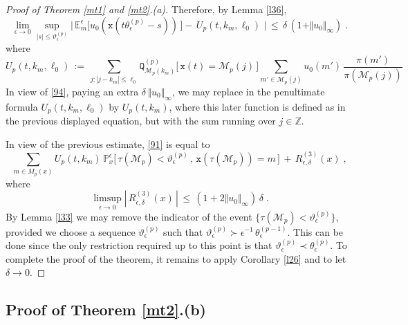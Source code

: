 \documentclass[reqno]{amsart}
\theoremstyle{plain}
\theoremstyle{definition}
\newcommand{\bb}[1]{{\mathbb #1}}
\newcommand{\ms}[1]{{\mathscr #1}}
\newcommand{\mtt}[1]{{\mathtt #1}}
\newcounter{as}[section]
\newcommand{\<}{\langle}
\renewcommand{\>}{\rangle}
\begin{document}
\begin{proof}[Proof of Theorem \ref{mt1} and \ref{mt2}.{\rm (a)}]
Therefore, by Lemma \ref{l36},
\begin{equation*}
\lim_{\epsilon\to 0} \sup_{|s|\le \vartheta^{(p)}_\epsilon}
\Big|\, \bb E^{\epsilon}_{m} \big[ u_0( \mtt x(t\theta^{(p)}_\epsilon - s))
\,\big]  -\, U_p(t,k_m, \ell_0)  \,\,\Big|
\,\le\,  \delta\, (1+\Vert u_0\Vert_\infty)\;.
\end{equation*}
where
\begin{equation}
\label{95}
U_p(t,k_m, \ell_0) \,:=\, \sum_{j: |j-k_m|\le \ell_0}
\mtt {Q}_{\ms M_p(k_m)}^{(p)}\big[\, \mtt x(t)= \ms M_p(j)\,\big]
\sum_{m'\in \ms M_p(j)} u_0(m')\, 
\frac{\pi (m')}{\pi(\ms M_p(j))}
\end{equation}
In view of \eqref{94}, paying an extra
$\delta\, \Vert u_0\Vert_\infty$, we may replace in the penultimate
formula $U_p(t,k_m, \ell_0)$ by $U_p(t,k_m)$, where this later
function is defined as in the previous displayed equation, but with
the sum running over $j\in \bb Z$.

\smallskip{} In view of the previous
estimate, \eqref{91} is equal to
\begin{equation*}
\sum_{m\in M_p(x)} U_p(t,k_m) \, \bb P^{\epsilon}_{x}
\big[ \, \tau(\ms M_p) <
\vartheta^{(p)}_\epsilon\,,\,
\mtt x(\tau(\ms M_{p})) = m \,\big] \,+\, R^{(3)}_{\epsilon, \delta} (x)\;,
\end{equation*}
where
\begin{equation*}
\limsup_{\epsilon\to 0} |\, R^{(3)}_{\epsilon, \delta} (x) \,| \,\le
\, (1+ 2\Vert u_0\Vert_\infty) \, \delta  \;.
\end{equation*}
By Lemma \ref{l33} we may remove the indicator of the event
$\{ \tau(\ms M_p) < \vartheta^{(p)}_\epsilon\}$, provided we choose a
sequence $\vartheta^{(p)}_\epsilon$ such that
$\vartheta^{(p)}_\epsilon \succ \epsilon^{-1}\,
\theta^{(p-1)}_\epsilon$.  This can be done since the only restriction
required up to this point is that
$\vartheta^{(p)}_\epsilon \prec \theta^{(p)}_\epsilon$.  To complete
the proof of the theorem, it remains to apply Corollary \ref{l26} and
to let $\delta\to 0$.
\end{proof}

\subsection*{Proof of Theorem \ref{mt2}.{\rm (b)}}
\end{document}
